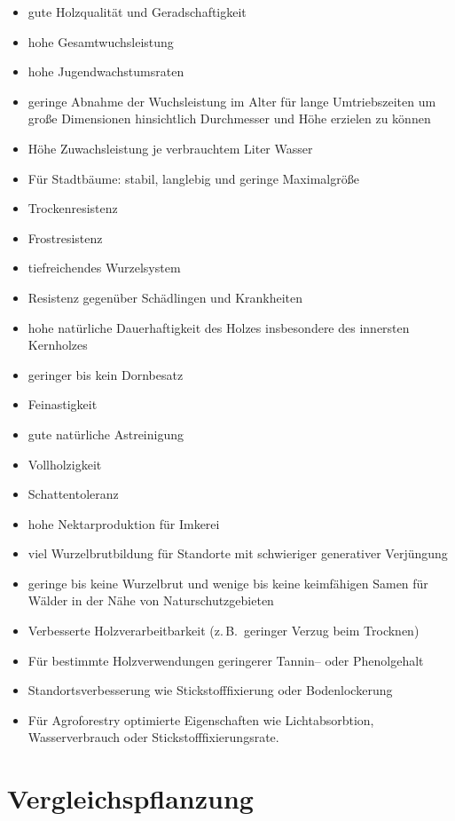 \documentclass[twocolumn]{scrartcl}
\begin{document}
\begin{itemize}
  \item gute Holzqualität und Geradschaftigkeit
  \item hohe Gesamtwuchsleistung
  \item hohe Jugendwachstumsraten
  \item geringe Abnahme der Wuchsleistung im Alter für lange Umtriebszeiten um große Dimensionen hinsichtlich Durchmesser und Höhe erzielen zu können
  \item Höhe Zuwachsleistung je verbrauchtem Liter Wasser
  \item Für Stadtbäume: stabil, langlebig und geringe Maximalgröße 
  \item Trockenresistenz
  \item Frostresistenz
  \item tiefreichendes Wurzelsystem
  \item Resistenz gegenüber Schädlingen und Krankheiten
  \item hohe natürliche Dauerhaftigkeit des Holzes insbesondere des innersten Kernholzes
  \item geringer bis kein Dornbesatz
  \item Feinastigkeit
  \item gute natürliche Astreinigung
  \item Vollholzigkeit
  \item Schattentoleranz
  \item hohe Nektarproduktion für Imkerei
  \item viel Wurzelbrutbildung für Standorte mit schwieriger generativer Verjüngung
  \item geringe bis keine Wurzelbrut und wenige bis keine keimfähigen Samen für Wälder in der Nähe von Naturschutzgebieten
  \item Verbesserte Holzverarbeitbarkeit (z.\,B.\ geringer Verzug beim Trocknen)
  \item Für bestimmte Holzverwendungen geringerer Tannin-- oder Phenolgehalt
  \item Standortsverbesserung wie Stickstofffixierung oder Bodenlockerung
  \item Für Agroforestry optimierte Eigenschaften wie Lichtabsorbtion, Wasserverbrauch oder Stickstofffixierungsrate.
\end{itemize}

\section{Vergleichspflanzung}
\end{document}
